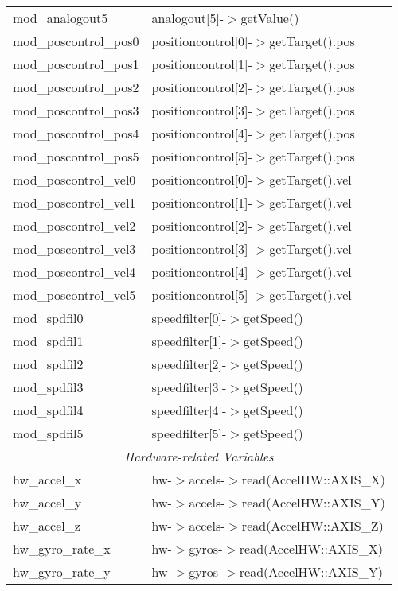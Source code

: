 \begin{center}
\begin{longtable}{|l|l|}
      mod\_analogout5 & analogout[5]-$>$getValue()\\
      mod\_poscontrol\_pos0 & positioncontrol[0]-$>$getTarget().pos\\
      mod\_poscontrol\_pos1 & positioncontrol[1]-$>$getTarget().pos\\
      mod\_poscontrol\_pos2 & positioncontrol[2]-$>$getTarget().pos\\
      mod\_poscontrol\_pos3 & positioncontrol[3]-$>$getTarget().pos\\
      mod\_poscontrol\_pos4 & positioncontrol[4]-$>$getTarget().pos\\
      mod\_poscontrol\_pos5 & positioncontrol[5]-$>$getTarget().pos\\
      mod\_poscontrol\_vel0 & positioncontrol[0]-$>$getTarget().vel\\
      mod\_poscontrol\_vel1 & positioncontrol[1]-$>$getTarget().vel\\
      mod\_poscontrol\_vel2 & positioncontrol[2]-$>$getTarget().vel\\
      mod\_poscontrol\_vel3 & positioncontrol[3]-$>$getTarget().vel\\
      mod\_poscontrol\_vel4 & positioncontrol[4]-$>$getTarget().vel\\
      mod\_poscontrol\_vel5 & positioncontrol[5]-$>$getTarget().vel\\
      mod\_spdfil0 & speedfilter[0]-$>$getSpeed()\\
      mod\_spdfil1 & speedfilter[1]-$>$getSpeed()\\
      mod\_spdfil2 & speedfilter[2]-$>$getSpeed()\\
      mod\_spdfil3 & speedfilter[3]-$>$getSpeed()\\
      mod\_spdfil4 & speedfilter[4]-$>$getSpeed()\\
      mod\_spdfil5 & speedfilter[5]-$>$getSpeed()\\
      \hline
      \multicolumn{2}{|c|}{\emph{Hardware-related Variables}}\\
      \hline
      hw\_accel\_x & hw-$>$accels-$>$read(AccelHW::AXIS\_X)\\
      hw\_accel\_y & hw-$>$accels-$>$read(AccelHW::AXIS\_Y)\\
      hw\_accel\_z & hw-$>$accels-$>$read(AccelHW::AXIS\_Z)\\
      hw\_gyro\_rate\_x & hw-$>$gyros-$>$read(AccelHW::AXIS\_X)\\
      hw\_gyro\_rate\_y & hw-$>$gyros-$>$read(AccelHW::AXIS\_Y)\\

\end{longtable}
\end{center}
